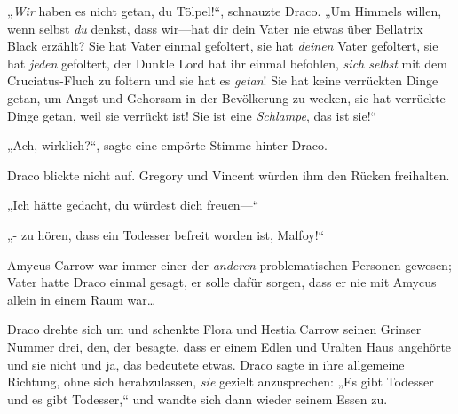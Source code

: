 „\emph{Wir} haben es nicht getan, du Tölpel!“, schnauzte Draco. „Um Himmels willen, wenn selbst \emph{du} denkst, dass wir—hat dir dein Vater nie etwas über Bellatrix Black erzählt? Sie hat Vater einmal gefoltert, sie hat \emph{deinen} Vater gefoltert, sie hat \emph{jeden} gefoltert, der Dunkle Lord hat ihr einmal befohlen, \emph{sich selbst} mit dem Cruciatus-Fluch zu foltern und sie hat es \emph{getan}! Sie hat keine verrückten Dinge getan, um Angst und Gehorsam in der Bevölkerung zu wecken, sie hat verrückte Dinge getan, weil sie verrückt ist! Sie ist eine \emph{Schlampe}, das ist sie!“

„Ach, wirklich?“, sagte eine empörte Stimme hinter Draco.

Draco blickte nicht auf. Gregory und Vincent würden ihm den Rücken freihalten.

„Ich hätte gedacht, du würdest dich freuen—“

„- zu hören, dass ein Todesser befreit worden ist, Malfoy!“

Amycus Carrow war immer einer der \emph{anderen} problematischen Personen gewesen; Vater hatte Draco einmal gesagt, er solle dafür sorgen, dass er nie mit Amycus allein in einem Raum war…

Draco drehte sich um und schenkte Flora und Hestia Carrow seinen Grinser Nummer drei, den, der besagte, dass er einem Edlen und Uralten Haus angehörte und sie nicht und ja, das bedeutete etwas. Draco sagte in ihre allgemeine Richtung, ohne sich herabzulassen, \emph{sie} gezielt anzusprechen: „Es gibt Todesser und es gibt Todesser,“ und wandte sich dann wieder seinem Essen zu.

